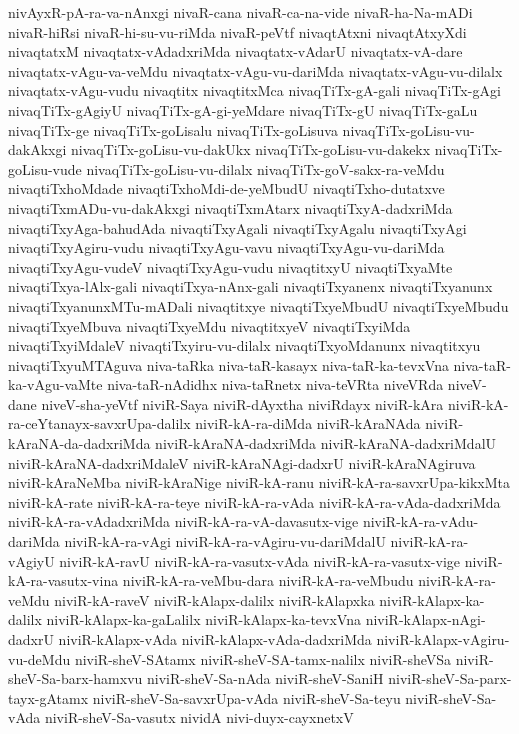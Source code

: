 {nivAyxR-pA-ra-va-nAnxgi
nivaR-cana
nivaR-ca-na-vide
nivaR-ha-Na-mADi
nivaR-hiRsi
nivaR-hi-su-vu-riMda
nivaR-peVtf
nivaqtAtxni
nivaqtAtxyXdi
nivaqtatxM
nivaqtatx-vAdadxriMda
nivaqtatx-vAdarU
nivaqtatx-vA-dare
nivaqtatx-vAgu-va-veMdu
nivaqtatx-vAgu-vu-dariMda
nivaqtatx-vAgu-vu-dilalx
nivaqtatx-vAgu-vudu
nivaqtitx
nivaqtitxMca
nivaqTiTx-gA-gali
nivaqTiTx-gAgi
nivaqTiTx-gAgiyU
nivaqTiTx-gA-gi-yeMdare
nivaqTiTx-gU
nivaqTiTx-gaLu
nivaqTiTx-ge
nivaqTiTx-goLisalu
nivaqTiTx-goLisuva
nivaqTiTx-goLisu-vu-dakAkxgi
nivaqTiTx-goLisu-vu-dakUkx
nivaqTiTx-goLisu-vu-dakekx
nivaqTiTx-goLisu-vude
nivaqTiTx-goLisu-vu-dilalx
nivaqTiTx-goV-sakx-ra-veMdu
nivaqtiTxhoMdade
nivaqtiTxhoMdi-de-yeMbudU
nivaqtiTxho-dutatxve
nivaqtiTxmADu-vu-dakAkxgi
nivaqtiTxmAtarx
nivaqtiTxyA-dadxriMda
nivaqtiTxyAga-bahudAda
nivaqtiTxyAgali
nivaqtiTxyAgalu
nivaqtiTxyAgi
nivaqtiTxyAgiru-vudu
nivaqtiTxyAgu-vavu
nivaqtiTxyAgu-vu-dariMda
nivaqtiTxyAgu-vudeV
nivaqtiTxyAgu-vudu
nivaqtitxyU
nivaqtiTxyaMte
nivaqtiTxya-lAlx-gali
nivaqtiTxya-nAnx-gali
nivaqtiTxyanenx
nivaqtiTxyanunx
nivaqtiTxyanunxMTu-mADali
nivaqtitxye
nivaqtiTxyeMbudU
nivaqtiTxyeMbudu
nivaqtiTxyeMbuva
nivaqtiTxyeMdu
nivaqtitxyeV
nivaqtiTxyiMda
nivaqtiTxyiMdaleV
nivaqtiTxyiru-vu-dilalx
nivaqtiTxyoMdanunx
nivaqtitxyu
nivaqtiTxyuMTAguva
niva-taRka
niva-taR-kasayx
niva-taR-ka-tevxVna
niva-taR-ka-vAgu-vaMte
niva-taR-nAdidhx
niva-taRnetx
niva-teVRta
niveVRda
niveV-dane
niveV-sha-yeVtf
niviR-Saya
niviR-dAyxtha
niviRdayx
niviR-kAra
niviR-kA-ra-ceYtanayx-savxrUpa-dalilx
niviR-kA-ra-diMda
niviR-kAraNAda
niviR-kAraNA-da-dadxriMda
niviR-kAraNA-dadxriMda
niviR-kAraNA-dadxriMdalU
niviR-kAraNA-dadxriMdaleV
niviR-kAraNAgi-dadxrU
niviR-kAraNAgiruva
niviR-kAraNeMba
niviR-kAraNige
niviR-kA-ranu
niviR-kA-ra-savxrUpa-kikxMta
niviR-kA-rate
niviR-kA-ra-teye
niviR-kA-ra-vAda
niviR-kA-ra-vAda-dadxriMda
niviR-kA-ra-vAdadxriMda
niviR-kA-ra-vA-davasutx-vige
niviR-kA-ra-vAdu-dariMda
niviR-kA-ra-vAgi
niviR-kA-ra-vAgiru-vu-dariMdalU
niviR-kA-ra-vAgiyU
niviR-kA-ravU
niviR-kA-ra-vasutx-vAda
niviR-kA-ra-vasutx-vige
niviR-kA-ra-vasutx-vina
niviR-kA-ra-veMbu-dara
niviR-kA-ra-veMbudu
niviR-kA-ra-veMdu
niviR-kA-raveV
niviR-kAlapx-dalilx
niviR-kAlapxka
niviR-kAlapx-ka-dalilx
niviR-kAlapx-ka-gaLalilx
niviR-kAlapx-ka-tevxVna
niviR-kAlapx-nAgi-dadxrU
niviR-kAlapx-vAda
niviR-kAlapx-vAda-dadxriMda
niviR-kAlapx-vAgiru-vu-deMdu
niviR-sheV-SAtamx
niviR-sheV-SA-tamx-nalilx
niviR-sheVSa
niviR-sheV-Sa-barx-hamxvu
niviR-sheV-Sa-nAda
niviR-sheV-SaniH
niviR-sheV-Sa-parx-tayx-gAtamx
niviR-sheV-Sa-savxrUpa-vAda
niviR-sheV-Sa-teyu
niviR-sheV-Sa-vAda
niviR-sheV-Sa-vasutx
nividA
nivi-duyx-cayxnetxV
}

